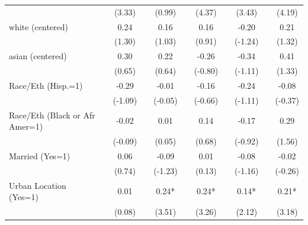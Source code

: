 {\begin{tabular*}{\hsize}{@{\hskip\tabcolsep\extracolsep\fill}l*{10}{c}}
                    &             &      (3.33) &             &      (0.99) &             &      (4.37) &             &      (3.43) &             &      (4.19) \\
white (centered)    &             &        0.24 &             &        0.16 &             &        0.16 &             &       -0.20 &             &        0.21 \\
                    &             &      (1.30) &             &      (1.03) &             &      (0.91) &             &     (-1.24) &             &      (1.32) \\
asian (centered)    &             &        0.30 &             &        0.22 &             &       -0.26 &             &       -0.34 &             &        0.41 \\
                    &             &      (0.65) &             &      (0.64) &             &     (-0.80) &             &     (-1.11) &             &      (1.33) \\
Race/Eth (Hisp.=1)  &             &       -0.29 &             &       -0.01 &             &       -0.16 &             &       -0.24 &             &       -0.08 \\
                    &             &     (-1.09) &             &     (-0.05) &             &     (-0.66) &             &     (-1.11) &             &     (-0.37) \\
Race/Eth (Black or Afr Amer=1)&             &       -0.02 &             &        0.01 &             &        0.14 &             &       -0.17 &             &        0.29 \\
                    &             &     (-0.09) &             &      (0.05) &             &      (0.68) &             &     (-0.92) &             &      (1.56) \\
Married (Yes=1)     &             &        0.06 &             &       -0.09 &             &        0.01 &             &       -0.08 &             &       -0.02 \\
                    &             &      (0.74) &             &     (-1.23) &             &      (0.13) &             &     (-1.16) &             &     (-0.26) \\
Urban Location (Yes=1)&             &        0.01 &             &        0.24*&             &        0.24*&             &        0.14*&             &        0.21*\\
                    &             &      (0.08) &             &      (3.51) &             &      (3.26) &             &      (2.12) &             &      (3.18) \\

\end{tabular*}}
